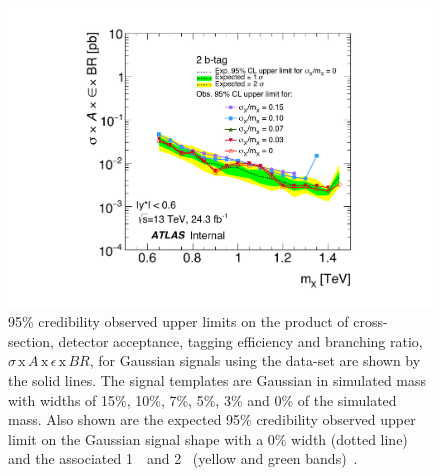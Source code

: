 \begin{figure}[!ht]
  \begin{center}
    \includegraphics[width=0.6\linewidth, angle=0]{figs/Dibjet/lowmass/lim-gaussian.pdf}
  \end{center}
  \caption[95\% credibility upper limits
    on the product of cross-section, detector acceptance, tagging efficiency and branching ratio,
    $\sigma\,\text{x}\,\mathit{A}\,\text{x}\,\epsilon\,\text{x}\,\mathit{BR}$,
    for Gaussian signals using the \lm{} data-set.]
  {95\% credibility observed upper limits
    on the product of cross-section, detector acceptance, tagging efficiency and branching ratio,
    $\sigma\,\text{x}\,\mathit{A}\,\text{x}\,\epsilon\,\text{x}\,\mathit{BR}$,
    for Gaussian signals using the \lm{} data-set are shown by the solid lines.
    The signal templates are Gaussian in simulated mass with
    widths of 15\%, 10\%, 7\%, 5\%, 3\% and 0\% of the simulated mass.
    Also shown are the expected 95\% credibility observed upper limit on the Gaussian signal shape with a 0\% width (dotted line)
    and the associated 1~\sigma\ and 2~\sigma{} (yellow and green bands)~\cite{dibjet-full_int}.
  }
  \label{fig:lim-lowmass_gauss}
\end{figure}

